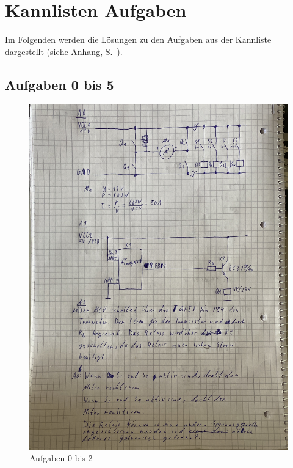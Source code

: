 \documentclass{article}
\begin{document}
\section{Kannlisten Aufgaben}

Im Folgenden werden die Lösungen zu den Aufgaben aus der Kannliste dargestellt (siehe Anhang, S.~\pageref{sec:Anhang}).

\subsection{Aufgaben 0 bis 5}

\begin{figure}[H]
    \centering
    \includegraphics[angle=270, width=0.85\linewidth]{A0_to_A2.jpg}
    \caption{Aufgaben 0 bis 2}
\end{figure}
\end{document}
